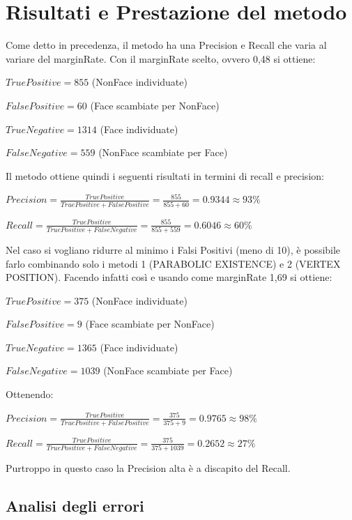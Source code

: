 \documentclass[
  italian,
]{article}
\begin{document}
\hypertarget{risultati-e-prestazione-del-metodo}{%
\section{Risultati e Prestazione del
metodo}\label{risultati-e-prestazione-del-metodo}}

Come detto in precedenza, il metodo ha una Precision e Recall che varia al variare del marginRate.
Con il marginRate scelto, ovvero 0,48 si ottiene:

\(True Positive = 855\) (NonFace individuate)

\(False Positive = 60\) (Face scambiate per NonFace)

\(True Negative = 1314\) (Face individuate)

\(False Negative = 559\) (NonFace scambiate per Face)

\bigskip
Il metodo ottiene quindi i seguenti risultati in termini di recall e
precision:

\(Precision = \frac{TruePositive}{TruePositive + FalsePositive} = \frac{855}{855+60} = 0.9344 \approx 93\%\)

\(Recall = \frac{TruePositive}{TruePositive + FalseNegative} = \frac{855}{855+559} = 0.6046 \approx 60\%\)

\pagebreak

Nel caso si vogliano ridurre al minimo i Falsi Positivi (meno di 10), è possibile farlo combinando solo i metodi 1 (PARABOLIC EXISTENCE) e 2 (VERTEX POSITION).
Facendo infatti così e usando come marginRate 1,69 si ottiene:

\(True Positive = 375\) (NonFace individuate)

\(False Positive = 9\) (Face scambiate per NonFace)

\(True Negative = 1365\) (Face individuate)

\(False Negative = 1039\) (NonFace scambiate per Face)

Ottenendo:

\(Precision = \frac{TruePositive}{TruePositive + FalsePositive} = \frac{375}{375+9} = 0.9765 \approx 98\%\)

\(Recall = \frac{TruePositive}{TruePositive + FalseNegative} = \frac{375}{375+1039} = 0.2652 \approx 27\%\)

Purtroppo in questo caso la Precision alta è a discapito del Recall.

\hypertarget{Analisi degli errori}{%
\subsection{Analisi degli errori}\label{Analisi degli errori}}
\end{document}
